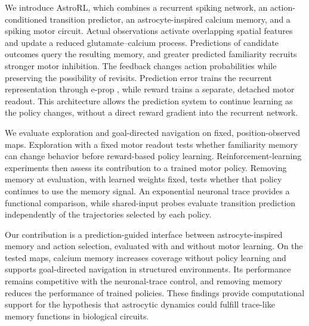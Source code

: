 We introduce AstroRL, which combines a recurrent spiking network, an action-conditioned transition predictor, an astrocyte-inspired calcium memory, and a spiking motor circuit. Actual observations activate overlapping spatial features and update a reduced glutamate--calcium process. Predictions of candidate outcomes query the resulting memory, and greater predicted familiarity recruits stronger motor inhibition. The feedback changes action probabilities while preserving the possibility of revisits. Prediction error trains the recurrent representation through e-prop \cite{bellec2020}, while reward trains a separate, detached motor readout. This architecture allows the prediction system to continue learning as the policy changes, without a direct reward gradient into the recurrent network.

We evaluate exploration and goal-directed navigation on fixed, position-observed maps. Exploration with a fixed motor readout tests whether familiarity memory can change behavior before reward-based policy learning. Reinforcement-learning experiments then assess its contribution to a trained motor policy. Removing memory at evaluation, with learned weights fixed, tests whether that policy continues to use the memory signal. An exponential neuronal trace provides a functional comparison, while shared-input probes evaluate transition prediction independently of the trajectories selected by each policy.

Our contribution is a prediction-guided interface between astrocyte-inspired memory and action selection, evaluated with and without motor learning. On the tested maps, calcium memory increases coverage without policy learning and supports goal-directed navigation in structured environments. Its performance remains competitive with the neuronal-trace control, and removing memory reduces the performance of trained policies. These findings provide computational support for the hypothesis that astrocytic dynamics could fulfill trace-like memory functions in biological circuits.